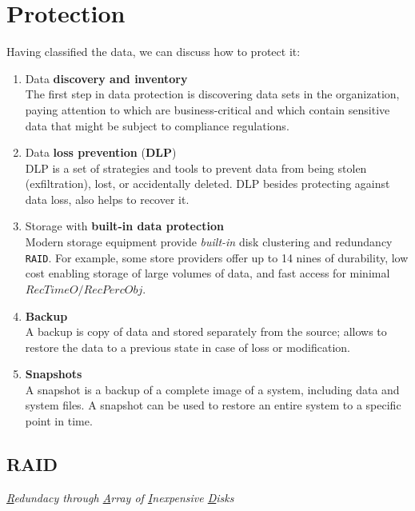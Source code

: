 \section{Protection}
Having classified the data, we can discuss how to protect it:
\begin{enumerate}
   \item Data \textbf{discovery and inventory}\\
   The first step in data protection is discovering data sets in the organization, paying attention to which are business-critical and which contain
   sensitive data that might be subject to compliance regulations.
   \item Data \textbf{loss prevention} (\textbf{DLP})\\
   DLP is a set of strategies and tools to prevent data from
   being stolen (exfiltration), lost, or accidentally deleted. 
   DLP besides protecting against data loss,
   also helps to recover it.
   \item Storage with \textbf{built-in data protection}\\
   Modern storage equipment provide
   \textit{built-in} disk clustering and redundancy \texttt{RAID}.
   For example, some store
   providers offer up to 14 nines of durability, low cost enabling storage of large
   volumes of data, and fast access for minimal $RecTimeO/RecPercObj$.
   \item \textbf{Backup}\\
   A backup is copy of data and stored separately from the source;
   allows to restore the data to a previous state in case of loss or modification.
   \item \textbf{Snapshots}\\
   A snapshot is a backup of a complete image of a system, including data and
   system files. 
   A snapshot can be used to restore an entire system to a specific point in time.
\end{enumerate}

\subsection{RAID}
\begin{center}
   \textit{\underline{R}edundacy through \underline{A}rray of \underline{I}nexpensive \underline{D}isks}
\end{center}


